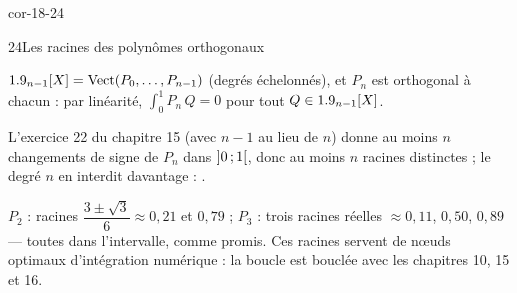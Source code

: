 \begin{blocLivre}{cor-18-24}
\begin{corrige}{24}{Les racines des polynômes orthogonaux}
\begin{questions}
  \item $1.9_{n-1}[X]=\operatorname{Vect}(P_0,\dots,P_{n-1})$ (degrés
    échelonnés), et $P_n$ est orthogonal à chacun : par linéarité,
    $\displaystyle\int_0^1P_n\,Q=0$ pour tout $Q\in1.9_{n-1}[X]$.
  \item L'exercice 22 du chapitre 15 (avec $n-1$ au lieu de $n$) donne
    au moins $n$ changements de signe de $P_n$ dans $\mathopen{]}0\,{;}\,1\mathclose{[}$,
    donc au moins $n$ racines distinctes ; le degré $n$ en interdit
    davantage : .
  \item $P_2$ : racines $\dfrac{3\pm\sqrt3}{6}\approx0{,}21$ et
    $0{,}79$ ; $P_3$ : trois racines réelles
    $\approx0{,}11$, $0{,}50$, $0{,}89$ — toutes dans l'intervalle,
    comme promis. Ces racines servent de nœuds optimaux d'intégration
    numérique : la boucle est bouclée avec les chapitres 10, 15 et 16.
\end{questions}
\end{corrige}
\end{blocLivre}



